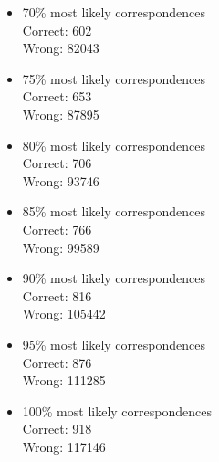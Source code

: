 \documentclass{article}
\begin{document}
\begin{itemize}
\item{70\% most likely correspondences} \\ Correct: 602\\ Wrong: 82043
\item{75\% most likely correspondences} \\ Correct: 653\\ Wrong: 87895
\item{80\% most likely correspondences} \\ Correct: 706\\ Wrong: 93746
\item{85\% most likely correspondences} \\ Correct: 766\\ Wrong: 99589
\item{90\% most likely correspondences} \\ Correct: 816\\ Wrong: 105442
\item{95\% most likely correspondences} \\ Correct: 876\\ Wrong: 111285
\item{100\% most likely correspondences} \\ Correct: 918\\ Wrong: 117146
\end{itemize}
\end{document}
